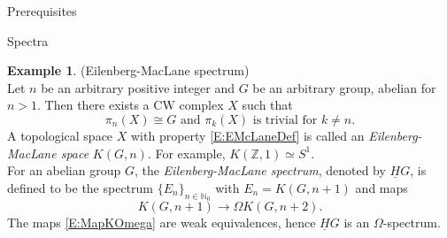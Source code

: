 \documentclass[12pt]{amsart}
\newcommand{\Z}{{\mathbb Z}}
\theoremstyle{plain}
\newtheorem{thm}{Theorem}[section]
\theoremstyle{definition}
\newtheorem{defin}[thm]{Definition}
\newtheorem{example}[thm]{Example}
\theoremstyle{remark}
\begin{document}
\begin{section}{Prerequisites}
\begin{subsection}{Spectra}

\begin{example}(Eilenberg-MacLane spectrum)\\
Let $n$ be an arbitrary positive integer and $G$ be an arbitrary group, abelian for $n>1$. Then there exists a $\text{CW}$ complex $X$ such that
\begin{equation}\label{E:EMcLaneDef}
\pi_n(X) \cong G \text{ and } \pi_k(X) \text{ is trivial for } k \neq n.
\end{equation}
A topological space $X$ with property \eqref{E:EMcLaneDef} is called an \textit{Eilenberg-MacLane space} $K(G,n)$. For example, $K(\Z,1) \simeq S^1$.\\
For an abelian group $G$, the \textit{Eilenberg-MacLane spectrum}, denoted by $\underline{H}G$, is defined to be the spectrum $\{E_n\}_{n\in \mathbb{N}_0}$  with $E_n=K(G,n+1)$ and maps
\begin{equation}\label{E:MapKOmega}
K(G,n+1) \rightarrow \Omega K(G,n+2).
\end{equation}
The maps \eqref{E:MapKOmega} are weak equivalences, 
hence $\underline{H}G$ is an $\Omega$-spectrum.
\end{example}


\end{subsection}
\end{section}
\end{document}
